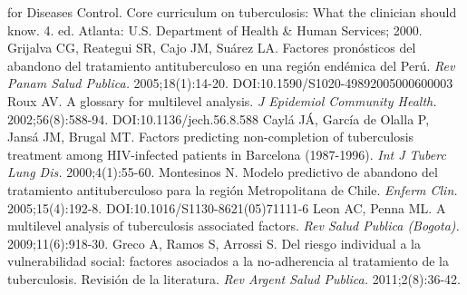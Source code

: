 \begin{multicols}{2}
\begin{biblio}[REFERENCES]
for Diseases Control.\allowbreak{} Core curriculum on tuberculosis:\allowbreak{} What the clinician should know.\allowbreak{} 4.\allowbreak{} ed.\allowbreak{} Atlanta:\allowbreak{} U.\allowbreak{}S.\allowbreak{} Department of Health \&\allowbreak{\allowbreak{}\allowbreak{}}\allowbreak{} Human Services; 2000.\allowbreak{}
\allowbreak{} Grijalva CG,\allowbreak{} Reategui SR,\allowbreak{} Cajo JM,\allowbreak{} Suárez LA.\allowbreak{} Factores pronósticos del abandono del tratamiento antituberculoso en una región endémica del Perú.\allowbreak{} \textit{Rev Panam Salud Publica.\allowbreak{} }2005;18(\allowbreak{}1)\allowbreak{}:\allowbreak{}14-\allowbreak{}20.\allowbreak{} DOI:\allowbreak{}10.\allowbreak{}1590\fshyp{}S1020-\allowbreak{}49892005000600003
Roux AV.\allowbreak{} A glossary for multilevel analysis.\allowbreak{} \textit{J Epidemiol Community Health.\allowbreak{} }2002;56(\allowbreak{}8)\allowbreak{}:\allowbreak{}588-\allowbreak{}94.\allowbreak{} DOI:\allowbreak{}10.\allowbreak{}1136\fshyp{}jech.\allowbreak{}56.\allowbreak{}8.\allowbreak{}588
\allowbreak{} Caylá JÁ,\allowbreak{} García de Olalla P,\allowbreak{} Jansá JM,\allowbreak{} Brugal MT.\allowbreak{} Factors predicting non-\allowbreak{}completion of tuberculosis treatment among HIV-\allowbreak{}infected patients in Barcelona (\allowbreak{}1987-\allowbreak{}1996)\allowbreak{}.\allowbreak{} \textit{Int J Tuberc Lung Dis.\allowbreak{} }2000;4(\allowbreak{}1)\allowbreak{}:\allowbreak{}55-\allowbreak{}60.\allowbreak{}
\allowbreak{} Montesinos N.\allowbreak{} Modelo predictivo de abandono del tratamiento antituberculoso para la región Metropolitana de Chile.\allowbreak{} \textit{Enferm Clin.\allowbreak{} }2005;15(\allowbreak{}4)\allowbreak{}:\allowbreak{}192-\allowbreak{}8.\allowbreak{} DOI:\allowbreak{}10.\allowbreak{}1016\fshyp{}S1130-\allowbreak{}8621(\allowbreak{}05)\allowbreak{}71111-\allowbreak{}6
\allowbreak{} Leon AC,\allowbreak{} Penna ML.\allowbreak{} A multilevel analysis of tuberculosis associated factors.\allowbreak{} \textit{Rev Salud Publica (\allowbreak{}Bogota)\allowbreak{}.\allowbreak{}} 2009;11(\allowbreak{}6)\allowbreak{}:\allowbreak{}918-\allowbreak{}30.\allowbreak{}
\allowbreak{} Greco A,\allowbreak{} Ramos S,\allowbreak{} Arrossi S.\allowbreak{} Del riesgo individual a la vulnerabilidad social:\allowbreak{} factores asociados a la no-\allowbreak{}adherencia al tratamiento de la tuberculosis.\allowbreak{} Revisión de la literatura.\allowbreak{} \textit{Rev Argent Salud Publica.\allowbreak{} }2011;2(\allowbreak{}8)\allowbreak{}:\allowbreak{}36-\allowbreak{}42.\allowbreak{}

\end{biblio}
\end{multicols}
